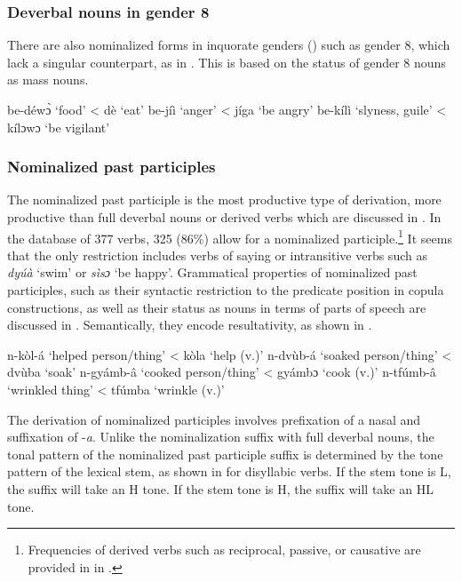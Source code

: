 \subsubsection{Deverbal nouns in gender 8}
\label{NOM8}

There are also nominalized forms in inquorate genders () such as gender 8, which lack a singular counterpart, as in . This is based on the status of gender 8 nouns as mass nouns.

\ea \label{eventmass}
\ea be-déwɔ̀ `food' < dè `eat'
 \ex be-jíì `anger' < jíga `be angry'
 \ex be-kílì `slyness, guile' < kílɔwɔ `be vigilant'
\z
\z









\subsubsection{Nominalized past participles}
\label{sec:NOMPart}

The nominalized past participle is the most productive type of derivation, more productive than  full deverbal nouns or derived verbs which are discussed in . In the database of 377 verbs, 325 (86\%) allow for a nominalized participle.\footnote{Frequencies of derived verbs such as reciprocal, passive, or causative are provided in  in .} It seems that the only restriction includes verbs of saying or intransitive verbs such as {\itshape dyúà} `swim' or {\itshape sìsɔ} `be happy'. Grammatical properties of nominalized past participles, such as their syntactic restriction to the predicate position in copula constructions, as well as their status as nouns in terms of parts of speech are discussed in . Semantically, they encode resultativity, as shown in .

\ea \label{NomPart1}
\ea  n-kòl-á `helped person/thing' < kòla `help (v.)'
\ex n-dvùb-á `soaked person/thing' < dvùba `soak'
\ex n-gyámb-â `cooked person/thing' < gyámbɔ `cook (v.)'
\ex  n-tfúmb-â `wrinkled thing' < tfúmba `wrinkle (v.)'
\z
\z



The derivation of nominalized participles involves prefixation of a nasal and suffixation of -{\itshape a}. Unlike the nominalization suffix with full deverbal nouns, the tonal pattern of the nominalized past participle suffix is determined by the tone pattern of the lexical stem, as shown in  for disyllabic verbs. If the stem tone is L, the  suffix will take an H tone. If the stem tone is H, the suffix will take an HL tone.

